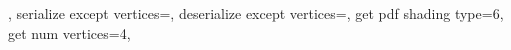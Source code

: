 {{{		\expandafter\pgfplotsplothandlermesh@setnextvertex\expandafter{\pgfplotspatchclass@rect@M}%
		\expandafter\pgfplotsplothandlermesh@setnextvertex\expandafter{\pgfplotspatchclass@rect@B}%
		\expandafter\pgfplotsplothandlermesh@setnextvertex\expandafter{\pgfplotspatchclass@rect@C}%
		\expandafter\pgfplotsplothandlermesh@setnextvertex\expandafter{\pgfplotspatchclass@rect@M}%
		\expandafter\pgfplotsplothandlermesh@setnextvertex\expandafter{\pgfplotspatchclass@rect@D}%
		\expandafter\pgfplotsplothandlermesh@setnextvertex\expandafter{\pgfplotspatchclass@rect@A}%
		\expandafter\pgfplotsplothandlermesh@setnextvertex\expandafter{\pgfplotspatchclass@rect@M}%
		\expandafter\pgfplotsplothandlermesh@setnextvertex\expandafter{\pgfplotspatchclass@rect@C}%
		\expandafter\pgfplotsplothandlermesh@setnextvertex\expandafter{\pgfplotspatchclass@rect@D}%
		\expandafter\pgfplotsplothandlermesh@setnextvertex\expandafter{\pgfplotspatchclass@rect@M}%
		\let\pgfplotsplothandlermesh@patchclass=\pgfplotsplothandlermesh@patchclass@
	},%
	serialize except vertices=\let\pgfplotsretval\pgfutil@empty,%
	deserialize except vertices=,
	get pdf shading type=6,
	get num vertices=4,
}%

\def\pgfplots@biquad@next@A{E}
\def\pgfplots@biquad@next@B{F}
\def\pgfplots@biquad@next@C{G}
\def\pgfplots@biquad@next@D{H}
\def\pgfplots@biquad@next@E{B}
\def\pgfplots@biquad@next@F{C}
\def\pgfplots@biquad@next@G{D}
\def\pgfplots@biquad@next@H{A}


\def\pgfplots@biquad@rnext@A{H}
\def\pgfplots@biquad@rnext@B{E}
\def\pgfplots@biquad@rnext@C{F}
\def\pgfplots@biquad@rnext@D{G}
\def\pgfplots@biquad@rnext@E{A}
\def\pgfplots@biquad@rnext@F{B}
\def\pgfplots@biquad@rnext@G{C}
\def\pgfplots@biquad@rnext@H{D}

}
